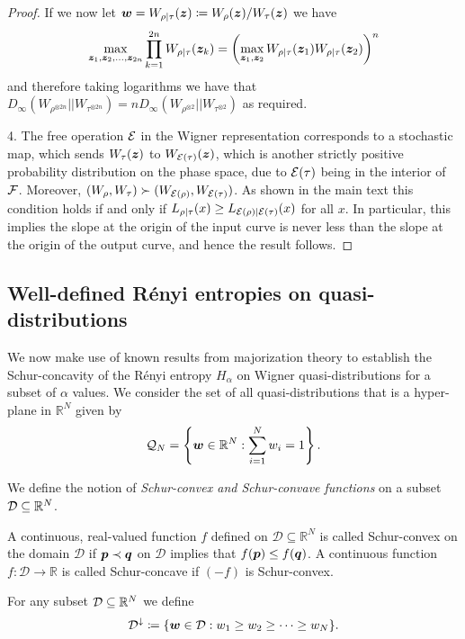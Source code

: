\documentclass[pra,
aps,
twocolumn,
superscriptaddress,
groupedaddress,
nofootinbib,
reprint
]{revtex4-1}
\begin{document}
\begin{proof}
If we now let $\boldsymbol{w} = W_{\rho|\tau}(\bm{z}) \coloneqq W_{\rho}(\bm{z}) /W_{\tau}(\bm{z})$ we have
\begin{equation}
\max_{\bm{z}_1, \bm{z}_2, \dots ,\bm{z}_{2n}} \prod_{k=1}^{2n} W_{\rho|\tau}(\bm{z}_k) = \left( \max_{\bm{z}_1, \bm{z}_2} W_{\rho|\tau}(\bm{z}_1)W_{\rho|\tau}(\bm{z}_2) \right)^n
\end{equation}
and therefore taking logarithms we have that $D_\infty(W_{\rho^{\otimes 2n}} || W_{\tau^{\otimes 2n}}) = n D_\infty(W_{\rho^{\otimes 2}} || W_{\tau^{\otimes 2}})$ as required.

4. The free operation ${\mathcal E}$ in the Wigner representation corresponds to a stochastic map, which sends $W_\tau(\bm{z})$ to $W_{{\mathcal E}(\tau)}(\bm{z})$, which is another strictly positive probability distribution on the phase space, due to ${\mathcal E}(\tau)$ being in the interior of ${\mathcal F}$. Moreover, $(W_\rho, W_\tau ) \succ (W_{{\mathcal E}(\rho)} , W_{{\mathcal E}(\tau)})$. As shown in the main text this condition holds if and only if $L_{\rho|\tau}(x) \ge L_{{\mathcal E}(\rho)|{\mathcal E}(\tau)}(x)$ for all $x$. In particular, this implies the slope at the origin of the input curve is never less than the slope at the origin of the output curve, and hence the result follows.
\end{proof}

\subsection{Well-defined R\'{e}nyi entropies on quasi-distributions}

We now make use of known results from majorization theory to establish the Schur-concavity of the R\'{e}nyi entropy $H_\alpha$ on Wigner quasi-distributions for a subset of $\alpha$ values. We consider the set of all quasi-distributions that is a hyper-plane in $\mathbb{R}^N$ given by
\begin{equation}
	\mathcal{Q}_N = \left\{ \boldsymbol{w} \in \mathbb{R}^N: \sum_{i=1}^N w_i = 1 \right\}.
\end{equation}

We define the notion of \emph{Schur-convex and Schur-convave functions} on a subset ${\mathcal D} \subseteq \mathbb{R}^N$.
\begin{definition} 
	A continuous, real-valued function $f$ defined on $\mathcal{D} \subseteq \mathbb{R}^N$ is called Schur-convex on the domain $\mathcal{D}$ if $\boldsymbol{p} \prec \boldsymbol{q}$ on $\mathcal{D}$ implies that $f(\boldsymbol{p}) \le f(\boldsymbol{q})$. A continuous function $f:\mathcal{D} \rightarrow \mathbb{R}$ is called Schur-concave if $(-f)$ is Schur-convex.
\end{definition}
For any subset ${\mathcal D} \subseteq \mathbb{R}^N$ we define
\begin{equation}
	\mathcal{D}^\downarrow \coloneqq \{ \boldsymbol{w} \in \mathcal{D} : w_1 \ge w_2 \ge \cdots \ge w_N\}.
\end{equation}
\end{document}
